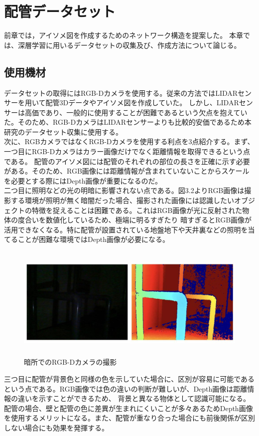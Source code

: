 \chapter{配管データセット}

前章では，アイソメ図を作成するためのネットワーク構造を提案した。
本章では、深層学習に用いるデータセットの収集及び、作成方法について論じる。


\section{使用機材}
データセットの取得にはRGB-Dカメラを使用する。従来の方法ではLIDARセンサーを用いて配管3Dデータやアイソメ図を作成していた。
しかし、LIDARセンサーは高価であり、一般的に使用することが困難であるという欠点を抱えていた。そのため、RGB-DカメラはLIDARセンサーよりも比較的安価であるため本研究のデータセット収集に使用する。\\
次に、RGBカメラではなくRGB-Dカメラを使用する利点を3点紹介する。まず、一つ目にRGB-Dカメラはカラー画像だけでなく距離情報を取得できるという点である。
配管のアイソメ図には配管のそれぞれの部位の長さを正確に示す必要がある。そのため、RGB画像には距離情報が含まれていないことからスケールを必要とする際にはDepth画像が重要になるのだ。\\
二つ目に照明などの光の明暗に影響されない点である。図3.2よりRGB画像は撮影する環境が照明が無く暗闇だった場合、撮影された画像には認識したいオブジェクトの特徴を捉えることは困難である。これはRGB画像が光に反射された物体の度合いを数値化しているため、極端に明るすぎたり
暗すぎるとRGB画像が活用できなくなる。特に配管が設置されている地盤地下や天井裏などの照明を当てることが困難な環境ではDepth画像が必要になる。\\
\begin{figure}[htbt]
    \centering
     \includegraphics[height=55mm]{pipe_rgbd.eps}
     \caption{暗所でのRGB-Dカメラの撮影}
     \label{fig:f2}
\end{figure}

三つ目に配管が背景色と同様の色を示していた場合に、区別が容易に可能であるという点である。RGB画像では色の違いの判断が難しいが、Depth画像は距離情報の違いを示すことができるため、
背景と異なる物体として認識可能になる。配管の場合、壁と配管の色に差異が生まれにくいことが多々あるためDepth画像を使用するメリットになる。また、配管が重なり合った場合にも前後関係が区別しない場合にも効果を発揮する。\\

